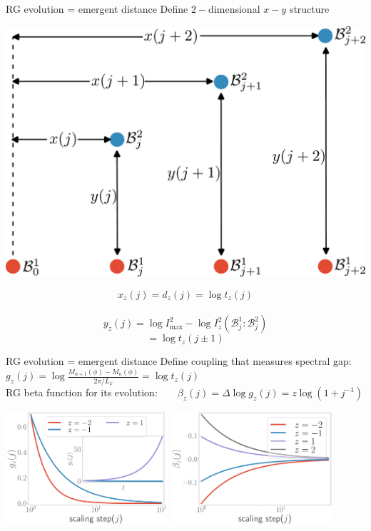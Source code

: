 \documentclass[11pt,aspectratio=169]{beamer}
\begin{document}
\begin{frame}{RG evolution = emergent distance}
	Define \(2-\)dimensional \(x-y\) structure\\[20pt]
	\begin{minipage}{0.55\textwidth}
	\includegraphics[width=\textwidth]{figures/curvature-scheme.pdf}
	\end{minipage}
	\begin{minipage}{0.44\textwidth}
	\[x_z(j) = d_z(j) = \log t_z(j)\]
	\\[10pt]
	\[y_z(j) = \log I^2_\text{max} - \log I_z^2(\mathcal{B}_j^1:\mathcal{B}_j^2)\]
\[= \log t_z(j \pm 1)\]
	\end{minipage}
\end{frame}

\begin{frame}{RG evolution = emergent distance}
	Define coupling that measures spectral gap:~ ~ \(g_z(j) = \log \frac{M_{n+1}(\phi) - M_n(\phi)}{2\pi/L_x} = \log t_z(j)\)\\[10pt]
	RG beta function for its evolution: ~ ~ \(\beta_z(j) = \Delta \log g_z(j) = z \log\left( 1 + j^{-1} \right) \)

	\vspace*{10pt}
	\includegraphics[width=0.45\textwidth]{figures/coupling.pdf}
	\hspace*{30pt}
	\includegraphics[width=0.45\textwidth]{figures/mass-beta.pdf}
\end{frame}
\end{document}
